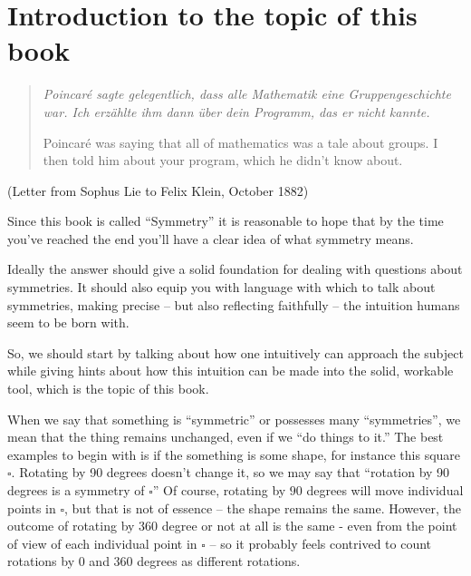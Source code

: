 \chapter{Introduction to the topic of this book}
\label{ch:intro}

\begin{quote}
  \itshape \foreignlanguage{ngerman}{Poincar\'e sagte gelegentlich,
  dass alle Mathematik eine Gruppengeschichte war.
  Ich erz\"ahlte ihm dann \"uber dein Programm,
  das er nicht kannte.}

  \smallskip

  \noindent Poincar\'e was saying
  that all of mathematics was a tale about groups.
  I then told him about your program,
  which he didn't know about.
\end{quote}
\hfill (Letter from Sophus Lie to Felix Klein, October 1882)

\bigskip



Since this book is called ``Symmetry'' it is reasonable to hope
that by the time you've reached the end you'll have a clear idea of
what symmetry means.

Ideally the answer should give a solid foundation for dealing with
questions about symmetries. It should also equip you with language
with which to talk about symmetries, making precise -- but also
reflecting faithfully -- the intuition humans seem to be born with.

So, we should start by talking about how one intuitively can approach the
subject while giving hints about how this intuition can be made into
the solid, workable tool, which is the topic of this book.


When we say that something is ``symmetric'' or possesses many ``symmetries'',
we mean that the thing remains unchanged, even if we ``do things to it.''
The best examples to begin with is if the something is some shape, for
instance this square $\square$. Rotating by 90 degrees doesn’t change it, so we may say that ``rotation by 90 degrees is a symmetry of $\square$''
Of course, rotating by $90$ degrees will move individual points in $\square$, but that
is not of essence -- the shape remains the same.
However, the outcome of rotating by $360$ degree or not at all
is the same - even from the point of view of each individual point in $\square$ -- so it probably feels contrived to count rotations by $0$ and $360$ degrees as different rotations.

